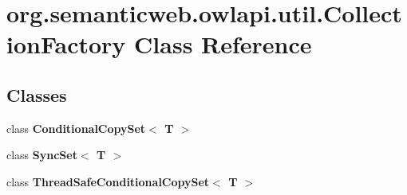 \hypertarget{classorg_1_1semanticweb_1_1owlapi_1_1util_1_1_collection_factory}{\section{org.\-semanticweb.\-owlapi.\-util.\-Collection\-Factory Class Reference}
\label{classorg_1_1semanticweb_1_1owlapi_1_1util_1_1_collection_factory}
}
\subsection*{Classes}
\begin{DoxyCompactItemize}
\item 
class {\bfseries Conditional\-Copy\-Set$<$ T $>$}
\item 
class {\bfseries Sync\-Set$<$ T $>$}
\item 
class {\bfseries Thread\-Safe\-Conditional\-Copy\-Set$<$ T $>$}
\end{DoxyCompactItemize}
